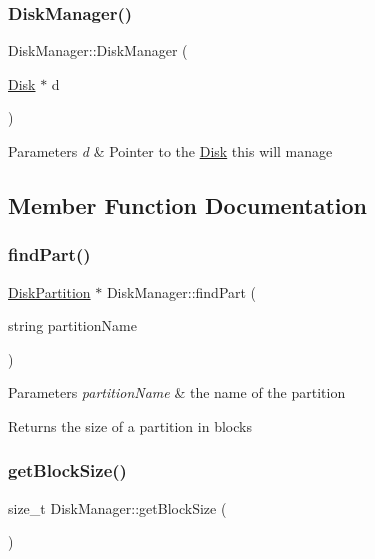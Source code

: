 \subsubsection{\texorpdfstring{Disk\+Manager()}{DiskManager()}}
{\footnotesize\ttfamily Disk\+Manager\+::\+Disk\+Manager (\begin{DoxyParamCaption}\item[{\mbox{\hyperlink{classDisk}{Disk}} $\ast$}]{d }\end{DoxyParamCaption})}


\begin{DoxyParams}{Parameters}
{\em d} & Pointer to the \mbox{\hyperlink{classDisk}{Disk}} this will manage \\
\hline
\end{DoxyParams}


\subsection{Member Function Documentation}
\mbox{\label{classDiskManager_a08375c254bc09c8351a4f96cb669f1ab}} 
\subsubsection{\texorpdfstring{find\+Part()}{findPart()}}
{\footnotesize\ttfamily \mbox{\hyperlink{structDiskPartition}{Disk\+Partition}} $\ast$ Disk\+Manager\+::find\+Part (\begin{DoxyParamCaption}\item[{string}]{partition\+Name }\end{DoxyParamCaption})}


\begin{DoxyParams}{Parameters}
{\em partition\+Name} & the name of the partition \\
\hline
\end{DoxyParams}
\begin{DoxyReturn}{Returns}
the size of a partition in blocks 
\end{DoxyReturn}
\mbox{\label{classDiskManager_aabdfbb2171f3c19a3ae14f9532876404}} 
\subsubsection{\texorpdfstring{get\+Block\+Size()}{getBlockSize()}}
{\footnotesize\ttfamily size\+\_\+t Disk\+Manager\+::get\+Block\+Size (\begin{DoxyParamCaption}{ }\end{DoxyParamCaption})}

